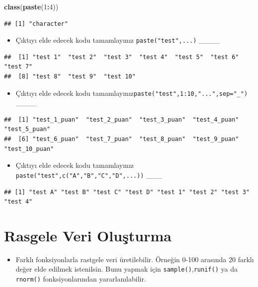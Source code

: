 \documentclass[
  oneside]{book}
\newenvironment{Shaded}{\begin{snugshade}}{\end{snugshade}}
\newcommand{\DecValTok}[1]{\textcolor[rgb]{0.00,0.00,0.81}{#1}}
\newcommand{\FunctionTok}[1]{\textcolor[rgb]{0.13,0.29,0.53}{\textbf{#1}}}
\newcommand{\NormalTok}[1]{#1}
\newcommand{\SpecialCharTok}[1]{\textcolor[rgb]{0.81,0.36,0.00}{\textbf{#1}}}
\providecommand{\tightlist}{%
  \setlength{\itemsep}{0pt}\setlength{\parskip}{0pt}}
\begin{document}
\begin{Shaded}
\begin{Highlighting}[]
\FunctionTok{class}\NormalTok{(}\FunctionTok{paste}\NormalTok{(}\DecValTok{1}\SpecialCharTok{:}\DecValTok{4}\NormalTok{))}
\end{Highlighting}
\end{Shaded}

\begin{verbatim}
## [1] "character"
\end{verbatim}

\begin{itemize}
\tightlist
\item
  Çıktıyı elde edecek kodu tamamlayınız \texttt{paste("test",...)} \_\_\_\_
\end{itemize}

\begin{verbatim}
##  [1] "test 1"  "test 2"  "test 3"  "test 4"  "test 5"  "test 6"  "test 7" 
##  [8] "test 8"  "test 9"  "test 10"
\end{verbatim}

\begin{itemize}
\tightlist
\item
  Çıktıyı elde edecek kodu tamamlayınız\texttt{paste("test",1:10,"...",sep="\_")} \_\_\_\_
\end{itemize}

\begin{verbatim}
##  [1] "test_1_puan"  "test_2_puan"  "test_3_puan"  "test_4_puan"  "test_5_puan" 
##  [6] "test_6_puan"  "test_7_puan"  "test_8_puan"  "test_9_puan"  "test_10_puan"
\end{verbatim}

\begin{itemize}
\tightlist
\item
  Çıktıyı elde edecek kodu tamamlayınız \texttt{paste("test",c("A","B","C","D",...))} \_\_\_
\end{itemize}

\begin{verbatim}
## [1] "test A" "test B" "test C" "test D" "test 1" "test 2" "test 3" "test 4"
\end{verbatim}

\hypertarget{rasgele-veri-oluux15fturma}{%
\section{Rasgele Veri Oluşturma}\label{rasgele-veri-oluux15fturma}}

\begin{itemize}
\tightlist
\item
  Farklı fonksiyonlarla rastgele veri üretilebilir. Örneğin 0-100 arasında 20 farklı değer elde edilmek istenilsin. Bunu yapmak için \texttt{sample()},\texttt{runif()} ya da \texttt{rnorm()} fonksiyonlarından yararlanılabilir.
\end{itemize}
\end{document}

